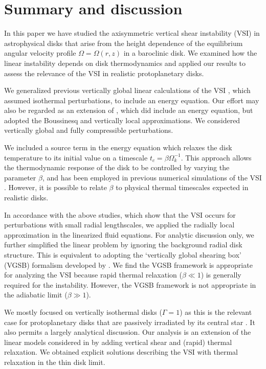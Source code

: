 \section{Summary and discussion}\label{summary}
In this paper we have studied the  axisymmetric vertical shear
instability (VSI) in astrophysical disks that arise from the
height dependence of the equilibrium angular velocity profile
$\Omega=\Omega(r,z)$ in a baroclinic disk. We examined how
the linear instability depends on disk thermodynamics and applied our
results to assess the relevance of the VSI in realistic protoplanetary
disks.  

We generalized previous vertically global linear 
calculations of the VSI \citep{nelson13,mcnally14}, which assumed isothermal
perturbations, to include an energy equation. Our effort may also be
regarded as an extension of \cite{urpin03}, which did include an
energy equation, but adopted the Boussinesq and vertically local
approximations. We considered vertically global and fully
compressible perturbations. 

We included a source term in the energy equation which relaxes the disk
temperature to its initial value on a timescale
$t_c=\beta\Omega_k^{-1}$. This approach allows the thermodynamic
response of the disk to be controlled by varying the parameter
$\beta$, and has been employed in previous numerical simulations of
the VSI \citep{nelson13}. However, it is possible to 
relate  $\beta$ to physical thermal timescales expected in realistic disks.  

In accordance with the above studies, which show that the VSI occurs for 
perturbations with small radial lengthscales, we applied the 
radially local approximation in the linearized fluid equations. For
analytic discussion only, we further simplified the linear problem by
ignoring the background radial disk structure. This is equivalent to adopting
the `vertically global shearing box' (VGSB) formalism developed by
\cite{mcnally14}. 
We find the VGSB framework is appropriate for analyzing the VSI because 
rapid thermal relaxation ($\beta\ll1$) is 
generally required for the instability.   However, the VGSB framework is not
appropriate in the adiabatic limit ($\beta \gg 1$). 
   

We mostly focused on vertically isothermal disks ($\Gamma=1$) as 
this is the relevant case for protoplanetary disks that are passively irradiated by its central star 
\citep{chiang97}. It also permits a largely analytical discussion.
Our analysis is an extension of the linear models considered in
\cite{lubow93} by  adding vertical shear and (rapid) thermal
relaxation. We obtained explicit solutions describing the VSI with 
thermal relaxation in the thin disk limit. 


